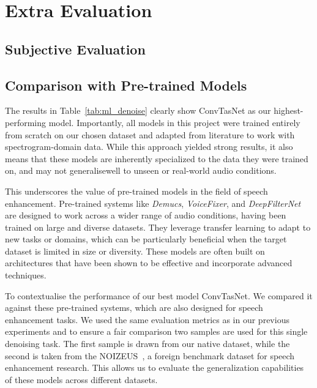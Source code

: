 \graphicspath{{content/appendices/figures}}
\chapter{Extra Evaluation}
\label{appendix:extra_evaluation}

\section{Subjective Evaluation}
\label{sec:subjective_evaluation}


\section{Comparison with Pre-trained Models}
\label{sec:pretrained_comparison}

The results in Table~\ref{tab:ml_denoise} clearly show ConvTasNet as our highest-performing model. Importantly, all models in this project were trained entirely from scratch on our chosen dataset and adapted from literature to work with spectrogram-domain data. While this approach yielded strong results, it also means that these models are inherently specialized to the data they were trained on, and may not generalisewell to unseen or real-world audio conditions.

This underscores the value of pre-trained models in the field of speech enhancement. Pre-trained systems like \textit{Demucs}, \textit{VoiceFixer}, and \textit{DeepFilterNet} are designed to work across a wider range of audio conditions, having been trained on large and diverse datasets. They leverage transfer learning to adapt to new tasks or domains, which can be particularly beneficial when the target dataset is limited in size or diversity. These models are often built on architectures that have been shown to be effective and incorporate advanced techniques.

To contextualise the performance of our best model ConvTasNet. We compared it against these pre-trained systems, which are also designed for speech enhancement tasks. We used the same evaluation metrics as in our previous experiments and to ensure a fair comparison two samples are used for this single denoising task. The first sample is drawn from our native dataset, while the second is taken from the NOIZEUS~\cite{hu2007subjective}, a foreign benchmark dataset for speech enhancement research. This allows us to evaluate the generalization capabilities of these models across different datasets.

